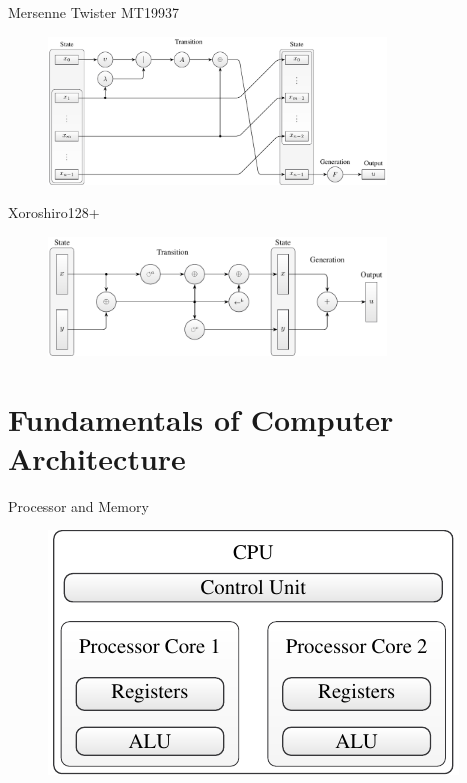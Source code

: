 \documentclass[aspectratio=169]{beamer}
\begin{document}
    \begin{frame}{Mersenne Twister MT19937}
      \begin{figure}
        \includegraphics[width=0.8\textwidth]{figures/mt19937_scheme.pdf}
      \end{figure}
    \end{frame}

    \begin{frame}{Xoroshiro128+}
      \begin{figure}
        \includegraphics[width=0.8\textwidth]{figures/xrsr128p_scheme.pdf}
      \end{figure}
    \end{frame}

  \section{Fundamentals of Computer Architecture} %
  \label{sec:fundamentals_of_computer_architecture}
    \begin{frame}{Processor and Memory}
      \begin{figure}
        \includegraphics[height=0.5\textheight]{figures/cpu_components.pdf}
      \end{figure}
    \end{frame}
\end{document}
